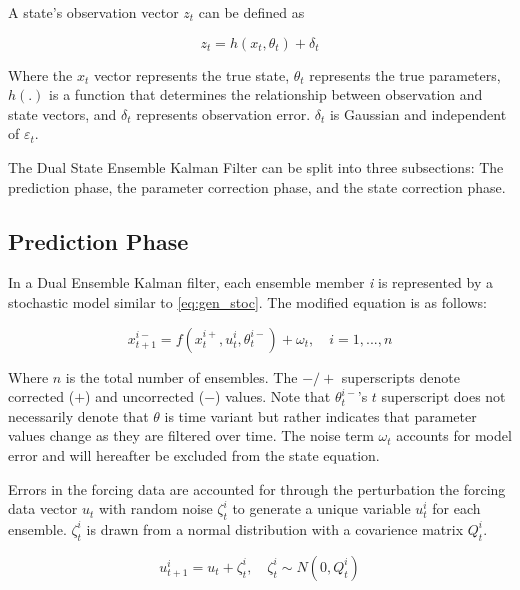 A state's observation vector $z_{t}$ can be defined as

\begin{equation}\label{eq:gen_obs}
z_{t} = h(x_{t}, \theta_{t}) + \delta_{t}
\end{equation}

Where the $x_{t}$ vector represents the true state, $\theta_{t}$ represents the true parameters, $h(.)$ is a function that determines the relationship between observation and state vectors, and $\delta_{t}$ represents observation error. $\delta_{t}$ is Gaussian and independent of $\varepsilon_{t}$.

The Dual State Ensemble Kalman Filter can be split into three subsections: The prediction phase, the parameter correction phase, and the state correction phase. 

\subsection{Prediction Phase}

In a Dual Ensemble Kalman filter, each ensemble member \textit{i} is represented by a stochastic model similar to \eqref{eq:gen_stoc}. The modified equation is as follows:

\begin{equation}\label{eq:dekf_predict}
x_{t+1}^{i-} = f(x_{t}^{i+}, u_{t}^{i}, \theta^{i-}_{t}) + \omega_{t}, \quad i=1,...,n
\end{equation}

Where $n$ is the total number of ensembles. The $-/+$ superscripts denote corrected ($+$) and uncorrected ($-$) values. Note that $\theta^{i-}_{t}$'s $t$ superscript does not necessarily denote that $\theta$ is time variant but rather indicates that parameter values change as they are filtered over time. The noise term $\omega_{t}$ accounts for model error and will hereafter be excluded from the state equation.

Errors in the forcing data are accounted for through the perturbation the forcing data vector $u_{t}$ with random noise $\zeta_{t}^{i}$ to generate a unique variable $u_{t}^{i}$ for each ensemble. $\zeta_{t}^{i}$ is drawn from a normal distribution with a covarience matrix $Q_{t}^{i}$.

\begin{equation}\label{eq:dekf_u}
u_{t+1}^{i} = u_{t} + \zeta_{t}^{i}, \quad \zeta_{t}^{i} \sim N(0,Q_{t}^{i}) 
\end{equation}

